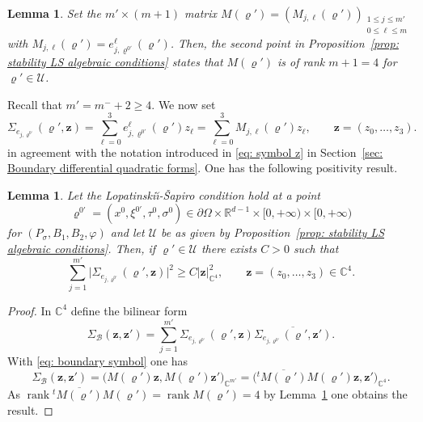 \documentclass[JEP,XML,SOM,Unicode,published]{cedram}
\theoremstyle{plain}
\newtheorem{lemma}[theorem]{Lemma}
\theoremstyle{definition}
\def\R{\mathbb{R}}
\def\C{\mathbb{C}}
\newcommand{\LS}{Lopatinski\u{\i}-\v{S}apiro\xspace}
\let\y\varrho
\newcommand{\ovl}[1]{\overline{#1}}
\newcommand{\biginp}[2]{\big(#1, #2 \big)}
\newcommand{\un}[1]{\Sigma_{#1}}
\newcommand{\U}{\mathscr U}
\newcommand{\z}{\boldsymbol{z}}
\newcommand{\transp}{\ensuremath{\phantom{}^{t}}}
\newcommand{\Psig}{P_{\sigma}}
\DeclareMathOperator{\rank}{rank}
\begin{document}
\begin{lemma}
\label{lemma: algebraic condition LS}
Set the $m' \times (m+1) $ matrix $M (\y') = (M_{j, \ell} (\y'))_{\substack{1\leq j \leq m'\\0\leq \ell \leq m}}$ with $M_{j, \ell} (\y') = e_{j, \y^{0\prime}}^\ell (\y')$. Then, the second point
in Proposition~\ref{prop: stability LS algebraic conditions} states
that $M (\y') $ is of rank \hbox{$m+1=4$} for $\y ' \in \U$.
\end{lemma}
Recall that $m' = m^- + 2 \geq 4$.
We now set
\begin{equation}
\label{eq: boundary symbol}
\un{e_{j, \y^{0\prime}}} (\y', \z) = \sum_{\ell=0}^{3} e_{j,
\y^{0\prime}}^\ell (\y') z_\ell = \sum_{\ell=0}^{3} M_{j, \ell}
(\y') z_\ell , \qquad \z = (z_0, \dots, z_3).
\end{equation}
in agreement with the notation introduced in \eqref{eq: symbol z} in Section~\ref{sec: Boundary differential quadratic forms}.
One has the following positivity result.

\begin{lemma}
\label{lemma: postivity boundary form}
Let the \LS condition hold at a point
\[
\y^{0\prime} = (x^0, \xi^{0\prime}, \tau^0, \sigma^0)\in \partial
\Omega \times \R^{d-1}\times [0,+\infty) \times [0,+\infty)
\]
for
$(\Psig, B_1, B_2, \varphi)$ and let $\U$ be as given by
Proposition~\ref{prop: stability LS algebraic conditions}.
Then, if $\y' \in \U$ there exists $C>0$ such that
\begin{equation*}
\sum_{j=1}^{m'} \big|\un{e_{j, \y^{0\prime}}} (\y', \z)\big|^2 \geq
C |\z|_{\C^{4}}^2,
\qquad \z = (z_0, \dots, z_3) \in \C^{4}.
\end{equation*}
\end{lemma}
\begin{proof}
In $\C^4$ define the bilinear form
\begin{equation*}
\Sigma_{\mathscr B} (\z, \z')
= \sum_{j=1}^{m'} \un{e_{j,\y^{0\prime}}} (\y', \z)
\ovl{\un{e_{j,\y^{0\prime}}} (\y', \z')}.
\end{equation*}
With \eqref{eq: boundary symbol} one has
\begin{equation*}
\Sigma_{\mathscr B} (\z, \z')
= \biginp{M (\y') \z}{M (\y') \z'}_{\C^{m'}}
= \biginp{\transp \ovl{M (\y')} M (\y') \z}{\z'}_{\C^{4}}.
\end{equation*}
As $\rank \transp \ovl{M (\y')} M (\y') = \rank M (\y') =4$ by
Lemma~\ref{lemma: algebraic condition LS} one obtains
the result.
\end{proof}
\end{document}
